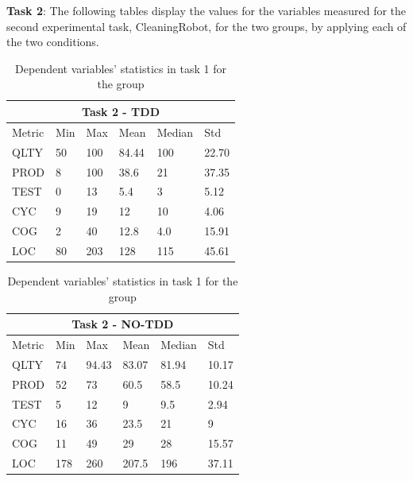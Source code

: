 \noindent \textbf{Task 2}: The following tables display the values for the variables measured for the second experimental task, CleaningRobot, for the two groups, by applying each of the two conditions.
\begin{table}[!h]
    \begin{center} 
        \begin{tabular}{ |p{2cm}||p{1.6cm}|p{1.6cm}|p{1.6cm}|p{1.6cm}|p{1.6cm}|}
            \hline
                \multicolumn{6}{|c|}{Task 2 - TDD} \\
            \hline
                Metric & Min & Max & Mean & Median & Std\\
            \hline
                QLTY & 50 & 100 & 84.44 & 100 & 22.70 \\
                PROD & 8 & 100 & 38.6 & 21 & 37.35 \\
                TEST & 0 & 13 & 5.4 & 3 & 5.12 \\
                CYC & 9 & 19 & 12 & 10 & 4.06 \\
                COG & 2 & 40 & 12.8 & 4.0 & 15.91 \\
                LOC & 80 & 203 & 128 & 115 & 45.61 \\
            \hline
        \end{tabular}
        \caption{\label{tab_dv_t2_tdd}Dependent variables' statistics in task 1 for the \tdd group}
    \end{center}
\end{table}

\begin{table}[!h]
    \begin{center} 
        \begin{tabular}{ |p{2cm}||p{1.6cm}|p{1.6cm}|p{1.6cm}|p{1.6cm}|p{1.6cm}|}
            \hline
                \multicolumn{6}{|c|}{Task 2 - NO-TDD} \\
            \hline
                Metric & Min & Max & Mean & Median & Std\\
            \hline
                QLTY & 74 & 94.43 & 83.07 & 81.94 & 10.17 \\
                PROD & 52 & 73 & 60.5 & 58.5 & 10.24 \\
                TEST & 5 & 12 & 9 & 9.5 & 2.94 \\
                CYC & 16 & 36 & 23.5 & 21 & 9 \\
                COG & 11 & 49 & 29 & 28 & 15.57 \\
                LOC & 178 & 260 & 207.5 & 196 & 37.11 \\
            \hline
        \end{tabular}
        \caption{\label{tab_dv_t2_notdd}Dependent variables' statistics in task 1 for the \notdd group}
    \end{center}
\end{table}

